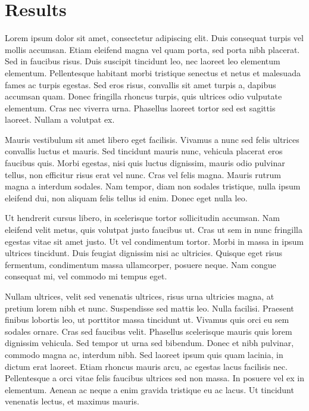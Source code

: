 \documentclass[aps,pre,twocolumn,letterpaper,floatfix,showpacs]{revtex4}
\begin{document}
\section{Results}
Lorem ipsum dolor sit amet, consectetur adipiscing elit. Duis consequat turpis vel mollis accumsan. Etiam eleifend magna vel quam porta, sed porta nibh placerat. Sed in faucibus risus. Duis suscipit tincidunt leo, nec laoreet leo elementum elementum. Pellentesque habitant morbi tristique senectus et netus et malesuada fames ac turpis egestas. Sed eros risus, convallis sit amet turpis a, dapibus accumsan quam. Donec fringilla rhoncus turpis, quis ultrices odio vulputate elementum. Cras nec viverra urna. Phasellus laoreet tortor sed est sagittis laoreet. Nullam a volutpat ex.

Mauris vestibulum sit amet libero eget facilisis. Vivamus a nunc sed felis ultrices convallis luctus et mauris. Sed tincidunt mauris nunc, vehicula placerat eros faucibus quis. Morbi egestas, nisi quis luctus dignissim, mauris odio pulvinar tellus, non efficitur risus erat vel nunc. Cras vel felis magna. Mauris rutrum magna a interdum sodales. Nam tempor, diam non sodales tristique, nulla ipsum eleifend dui, non aliquam felis tellus id enim. Donec eget nulla leo.

Ut hendrerit cursus libero, in scelerisque tortor sollicitudin accumsan. Nam eleifend velit metus, quis volutpat justo faucibus ut. Cras ut sem in nunc fringilla egestas vitae sit amet justo. Ut vel condimentum tortor. Morbi in massa in ipsum ultrices tincidunt. Duis feugiat dignissim nisi ac ultricies. Quisque eget risus fermentum, condimentum massa ullamcorper, posuere neque. Nam congue consequat mi, vel commodo mi tempus eget.

Nullam ultrices, velit sed venenatis ultrices, risus urna ultricies magna, at pretium lorem nibh et nunc. Suspendisse sed mattis leo. Nulla facilisi. Praesent finibus lobortis leo, ut porttitor massa tincidunt ut. Vivamus quis orci eu sem sodales ornare. Cras sed faucibus velit. Phasellus scelerisque mauris quis lorem dignissim vehicula. Sed tempor ut urna sed bibendum. Donec et nibh pulvinar, commodo magna ac, interdum nibh. Sed laoreet ipsum quis quam lacinia, in dictum erat laoreet. Etiam rhoncus mauris arcu, ac egestas lacus facilisis nec. Pellentesque a orci vitae felis faucibus ultrices sed non massa. In posuere vel ex in elementum. Aenean ac neque a enim gravida tristique eu ac lacus. Ut tincidunt venenatis lectus, et maximus mauris.
\end{document}
